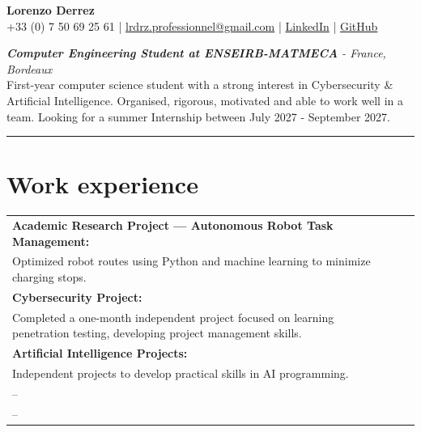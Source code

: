 \documentclass[10pt, a4paper]{article}
\begin{document}
\noindent





\hfill
\begin{minipage}[c]{0.70\textwidth}
\centering
{\LARGE \textbf{Lorenzo Derrez}}\\
+33 (0) 7 50 69 25 61 | \href{mailto:lrdrz.professionnel@gmail.com}{lrdrz.professionnel@gmail.com} | \href{https://www.linkedin.com/in/lorenzo-derrez}{LinkedIn} | \href{https://github.com/Nmrodd}{GitHub}
\end{minipage}
\hfill
\begin{minipage}[c]{1cm}
\end{minipage}

\begin{flushleft} %
    \large \textit{\textbf{Computer Engineering Student at ENSEIRB-MATMECA} - France, Bordeaux}
    \\[0.3em]
    First-year computer science student with a strong interest in Cybersecurity \& Artificial Intelligence. Organised, rigorous, motivated and able to work well in a team. Looking for a summer Internship  between July 2027 - September 2027.
\end{flushleft}

\rule{\textwidth}{0.4pt}  %

\section*{Work experience}

\begin{tabularx}{\textwidth}{@{}l X r@{}}
    \textbf{Academic Research Project — Autonomous Robot Task Management:}
    \\
    \small Optimized robot routes using Python and machine learning to minimize charging stops.
    \\
    \textbf{Cybersecurity Project:} 
    \\
    \small Completed a one-month independent project focused on learning penetration testing, developing project management skills.
    \\
    \textbf{Artificial Intelligence Projects:}
    \\ 
    \small Independent projects to develop practical skills in AI programming.
    \\
    \qquad --
    \\
    \qquad -- 
\end{tabularx}
\end{document}
